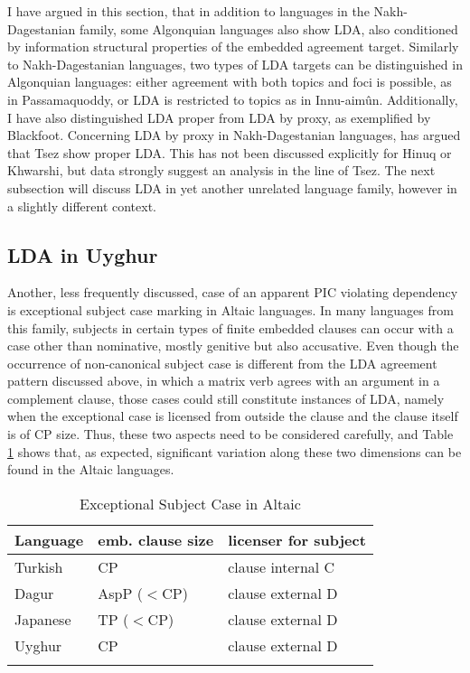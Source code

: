 \documentclass[output=paper
,modfonts
,nonflat]{langsci/langscibook}
\begin{document}
I have argued in this section, that in addition to languages in the Nakh-Da\-ges\-ta\-nian family, some Algonquian languages also show LDA, also conditioned by information structural properties of the embedded agreement target. Similarly to Nakh-Dagestanian languages, two types of LDA targets can be distinguished in Algonquian languages: either agreement with both topics and foci is possible, as in Passamaquoddy, or LDA is restricted to topics as in Innu-aim\^{u}n. Additionally, I have also distinguished LDA proper from LDA by proxy, as exemplified by Blackfoot. Concerning LDA by proxy in Nakh-Dagestanian languages, \citet{Polinsky2003} has argued that Tsez show proper LDA. This has not been discussed explicitly for Hinuq or Khwarshi, but data strongly suggest an analysis in the line of Tsez. The next subsection will discuss LDA in yet another unrelated language family, however in a slightly different context.

\subsection{LDA in Uyghur}

Another, less frequently discussed, case of an apparent PIC violating dependency is exceptional subject case marking in Altaic languages. In many languages from this family, subjects in certain types of finite embedded clauses can occur with a case other than nominative, mostly genitive but also accusative. Even though the occurrence of non-canonical subject case is different from the LDA agreement pattern discussed above, in which a matrix verb agrees with an argument in a complement clause, those cases could still constitute instances of LDA, namely when the exceptional case is licensed from outside the clause and the clause itself is of CP size. Thus, these two aspects need to be considered carefully, and Table \ref{tab:exc_s_c} shows that, as expected, significant variation along these two dimensions can be found in the Altaic languages.
\begin{table}
\caption{Exceptional Subject Case in Altaic}
\label{tab:exc_s_c}
 \begin{tabular}{lll} 
  \lsptoprule
  Language  & emb. clause size & licenser for subject\\
  \midrule
  Turkish \citep{Kornfilt2008} & CP & clause internal C\\
  Dagur \citep{Hale2002} & AspP ($ < $CP) & clause external D\\
  Japanese \citep{Miyagawa2011} & TP ($ < $CP) & clause external D\\
  Uyghur \citep{Asarina_Hartman2011a} & CP & clause external D\\
  \lspbottomrule
 \end{tabular}
\end{table}
\end{document}
